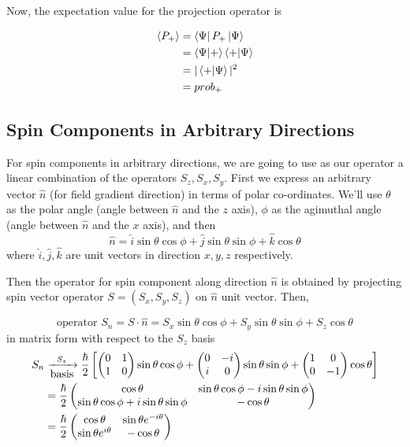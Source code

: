 \documentclass[english, 11pt]{article}
\begin{document}
      Now, the expectation value for the projection operator is

      \begin{align*}
        \E{P_+} & = \bra{\Psi}P_+\ket{\Psi} \\
                & = \braket{\Psi}{+}\braket{+}{\Psi} \\
                & = |\braket{+}{\Psi}|^2 \\
                & = prob_+
      \end{align*}

    \subsection{Spin Components in Arbitrary Directions}

      For spin components in arbitrary directions, we are going to use as our operator a linear combination of the operators $S_z, S_x, S_y$. First we express an arbitrary vector $\hat{n}$ (for field gradient direction) in terms of polar co-ordinates. We'll use $\theta$ as the polar angle (angle between $\hat{n}$ and the $z$ axis), $\phi$ as the agimuthal angle (angle between $\hat{n}$ and the $x$ axis), and then
      \[ \hat{n} = \hat{i}\sin\theta\cos\phi + \hat{j}\sin\theta\sin\phi + \hat{k}\cos\theta  \]
      where $\hat{i}, \hat{j}, \hat{k}$ are unit vectors in direction $x, y,z$ respectively.
      \newline

      Then the operator for spin component along direction $\hat{n}$ is obtained by projecting spin vector operator $S = (S_x,S_y,S_z)$ on $\hat{n}$ unit vector. Then,

      \[ \mbox{operator } S_n = S\cdot\hat{n} = S_x\sin\theta\cos\phi + S_y\sin\theta\sin\phi + S_z\cos\theta \]
      in matrix form with respect to the $S_z$ basis
      \begin{align*}
        S_n & \xrightarrow[\mbox{basis}]{S_z} \frac{\hbar}{2} \left[ \left(\begin{matrix}0 & 1 \\ 1 & 0\end{matrix}\right)\sin\theta\cos\phi + \left(\begin{matrix}0 & -i \\ i & 0\end{matrix}\right)\sin\theta\sin\phi + \left(\begin{matrix}1 & 0 \\ 0 & -1\end{matrix}\right)\cos\theta \right] \\
        & = \frac{\hbar}{2}\left(\begin{matrix}\cos\theta & \sin\theta\cos\phi - i\sin\theta\sin\phi \\ \sin\theta\cos\phi+i\sin\theta\sin\phi & - \cos\theta\end{matrix}\right) \\
        & = \frac{\hbar}{2}\left(\begin{matrix}\cos\theta & \sin\theta e^{-i\theta}\\ \sin\theta e^{i\theta} & -\cos\theta\end{matrix}\right)
      \end{align*}
\end{document}
